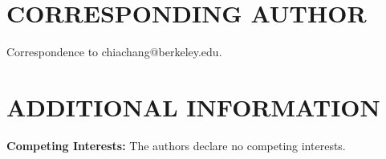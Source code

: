 \documentclass[10pt]{iopart}
\begin{document}
\section{CORRESPONDING AUTHOR}
Correspondence to chiachang@berkeley.edu.

\section{ADDITIONAL INFORMATION}

\textbf{Competing Interests:} The authors declare no competing interests.

%


\end{document}
